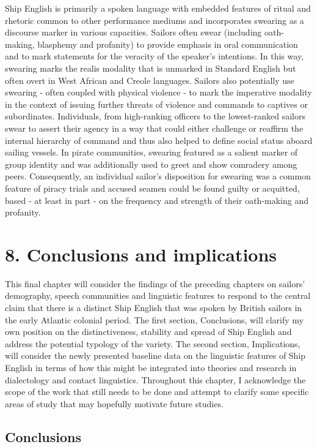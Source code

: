 Ship English is primarily a spoken language with embedded features of ritual and rhetoric common to other performance mediums and incorporates swearing as a discourse marker in various capacities. Sailors often swear (including oath-making, blasphemy and profanity) to provide emphasis in oral communication and to mark statements for the veracity of the speaker’s intentions. In this way, swearing marks the realis modality that is unmarked in Standard English but often overt in West African and Creole languages. Sailors also potentially use swearing - often coupled with physical violence - to mark the imperative modality in the context of issuing further threats of violence and commands to captives or subordinates. Individuals, from {high-ranking officers to the lowest-ranked sailors} swear to assert their agency in a way that could either challenge or reaffirm the internal hierarchy of command and thus also helped to define social status aboard sailing vessels. In pirate communities, swearing featured as a salient marker of group identity and was additionally used to greet and show comradery among peers.  Consequently, an individual sailor’s disposition for swearing was a common feature of piracy trials and accused seamen could be found guilty or acquitted, based - at least in part - on the frequency and strength of their oath-making and profanity. 

\chapter{{8.} {Conclusions} {and} {implications}}

This final chapter will consider the findings of the preceding chapters on sailors’ demography, speech communities and linguistic features to respond to the central claim that there is a distinct Ship English that was spoken by British sailors in the early Atlantic colonial period. The first section, Conclusions, will clarify my own position on the distinctiveness, stability and spread of Ship English and address the potential typology of the variety. The second section, Implications, will consider the newly presented baseline data on the linguistic features of Ship English in terms of how this might be integrated into theories and research in dialectology and contact linguistics. Throughout this chapter, I acknowledge the scope of the work that still needs to be done and attempt to clarify some specific areas of study that may hopefully motivate future studies.

\section{{Conclusions}}%

